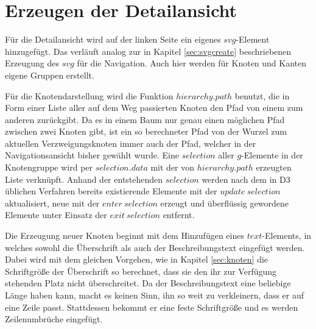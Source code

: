 \section{Erzeugen der Detailansicht}
Für die Detailansicht wird auf der linken Seite ein eigenes $svg$-Element hinzugefügt. Das verläuft analog zur in Kapitel \ref{sec:svgcreate} beschriebenen Erzeugung des $svg$ für die Navigation. Auch hier werden für Knoten und Kanten eigene Gruppen erstellt. 

Für die Knotendarstellung wird die Funktion $hierarchy.path$ benutzt, die in Form einer Liste aller auf dem Weg passierten Knoten den Pfad von einem zum anderen zurückgibt. Da es in einem Baum nur genau einen möglichen Pfad zwischen zwei Knoten gibt, ist ein so berechneter Pfad von der Wurzel zum aktuellen Verzweigungsknoten immer auch der Pfad, welcher in der Navigationsansicht bisher gewählt wurde. Eine $selection$ aller $g$-Elemente in der Knotengruppe wird per $selection.data$ mit der von $hierarchy.path$ erzeugten Liste verknüpft. Anhand der entstehenden $selection$ werden nach dem in D3 üblichen Verfahren bereits existierende Elemente mit der $update\ selection$ aktualisiert, neue mit der $enter\ selection$ erzeugt und überflüssig gewordene Elemente unter Einsatz der $exit\ selection$ entfernt.

Die Erzeugung neuer Knoten beginnt mit dem Hinzufügen eines $text$-Elements, in welches sowohl die Überschrift als auch der Beschreibungstext eingefügt werden. Dabei wird mit dem gleichen Vorgehen, wie in Kapitel \ref{sec:knoten} die Schriftgröße der Überschrift so berechnet, dass sie den ihr zur Verfügung stehenden Platz nicht überschreitet. Da der Beschreibungstext eine beliebige Länge haben kann, macht es keinen Sinn, ihn so weit zu verkleinern, dass er auf eine Zeile passt. Stattdessen bekommt er eine feste Schriftgröße und es werden Zeilenumbrüche eingefügt.

